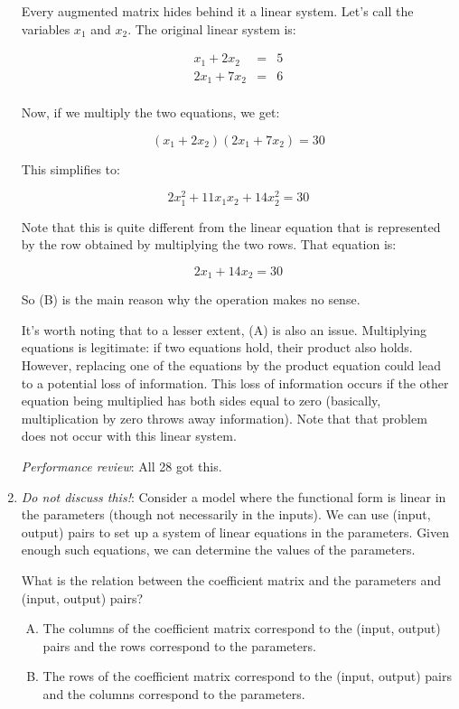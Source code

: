 \documentclass[10pt]{amsart}
\begin{document}
\begin{enumerate}
  Every augmented matrix hides behind it a linear system. Let's call
  the variables $x_1$ and $x_2$. The original linear system is:

  \begin{eqnarray*}
    x_1 + 2x_2 & = & 5\\
    2x_1 + 7x_2 & = & 6\\
  \end{eqnarray*}

  Now, if we multiply the two equations, we get:

  $$(x_1 + 2x_2)(2x_1 + 7x_2) = 30$$

  This simplifies to:

  $$2x_1^2 + 11x_1x_2 + 14x_2^2 = 30$$

  Note that this is quite different from the linear equation that is
  represented by the row obtained by multiplying the two rows. That
  equation is:

  $$2x_1 + 14x_2 = 30$$

  So (B) is the main reason why the operation makes no sense.

  It's worth noting that to a lesser extent, (A) is also an
  issue. Multiplying equations is legitimate: if two equations hold,
  their product also holds. However, replacing one of the equations by
  the product equation could lead to a potential loss of
  information. This loss of information occurs if the other equation
  being multiplied has both sides equal to zero (basically,
  multiplication by zero throws away information). Note that that
  problem does not occur with this linear system.

  {\em Performance review}: All 28 got this.

\item {\em Do not discuss this!}: Consider a model where the
  functional form is linear in the parameters (though not necessarily
  in the inputs). We can use (input, output) pairs to set up a system
  of linear equations in the parameters. Given enough such equations,
  we can determine the values of the parameters.

  What is the relation between the coefficient matrix and the
  parameters and (input, output) pairs?

  \begin{enumerate}[(A)]
  \item The columns of the coefficient matrix correspond to the
    (input, output) pairs and the rows correspond to the parameters.
  \item The rows of the coefficient matrix correspond to the
    (input, output) pairs and the columns correspond to the parameters.
  \end{enumerate}


\end{enumerate}
\end{document}
